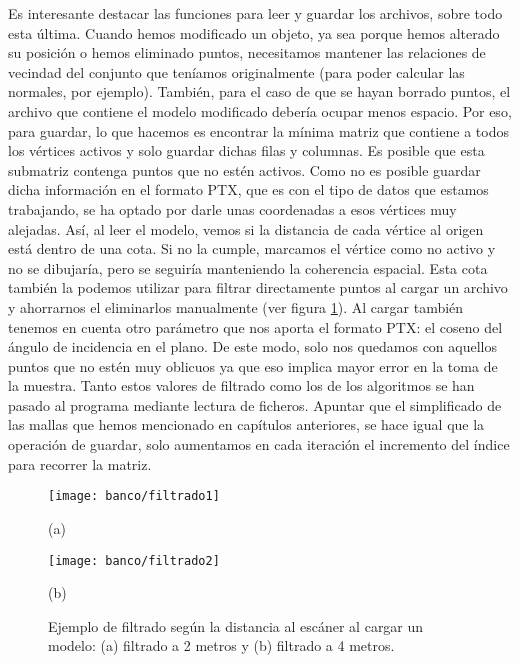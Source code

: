 Es interesante destacar las funciones para leer y guardar los archivos, sobre todo esta última. Cuando hemos modificado un objeto, ya sea porque hemos alterado su posición o hemos eliminado puntos, necesitamos mantener las relaciones de vecindad del conjunto que teníamos originalmente (para poder calcular las normales, por ejemplo). También, para el caso de que se hayan borrado puntos, el archivo que contiene el modelo modificado debería ocupar menos espacio. Por eso, para guardar, lo que hacemos es encontrar la mínima matriz que contiene a todos los vértices activos y solo guardar dichas filas y columnas. Es posible que esta submatriz contenga puntos que no estén activos. Como no es posible guardar dicha información en el formato PTX, que es con el tipo de datos que estamos trabajando, se ha optado por darle unas coordenadas a esos vértices muy alejadas. Así, al leer el modelo, vemos si la distancia de cada vértice al origen está dentro de una cota. Si no la cumple, marcamos el vértice como no activo y no se dibujaría, pero se seguiría manteniendo la coherencia espacial. Esta cota también la podemos utilizar para filtrar directamente puntos al cargar un archivo y ahorrarnos el eliminarlos manualmente (ver figura \ref{fig:filtrado}). Al cargar también tenemos en cuenta otro parámetro que nos aporta el formato PTX: el coseno del ángulo de incidencia en el plano. De este modo, solo nos quedamos con aquellos puntos que no estén muy oblicuos ya que eso implica mayor error en la toma de la muestra. Tanto estos valores de filtrado como los de los algoritmos se han pasado al programa mediante lectura de ficheros. Apuntar que el simplificado de las mallas  que hemos mencionado en capítulos anteriores, se hace igual que la operación de guardar, solo aumentamos en cada iteración el incremento del índice para recorrer la matriz.  \\

\begin{figure}[h!]
	\begin{minipage}{0.5\textwidth}
		\centering
		\texttt{[image: banco/filtrado1]} 
		\caption*{(a)}
	\end{minipage}
	\begin{minipage}{0.5\textwidth}
		\centering
		\texttt{[image: banco/filtrado2]} 
		\caption*{(b)}
	\end{minipage}
	\caption{Ejemplo de filtrado según la distancia al escáner al cargar un modelo: (a) filtrado a 2 metros y (b) filtrado a 4 metros.}
	\label{fig:filtrado}
\end{figure}

